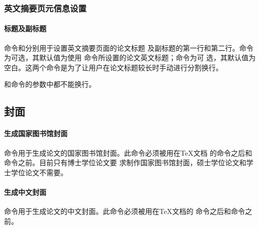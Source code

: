 \subsubsection{英文摘要页元信息设置}

\paragraph{标题及副标题}

命令和分别用于设置英文摘要页面的论文标题
及副标题的第一行和第二行。命令为可选，其默认值为使用
命令所设置的论文英文标题；命令为可
选，其默认值为空白。这两个命令是为了让用户在论文标题较长时手动进行分割换行。
\begin{tex}
\end{tex}
\begin{note}
和命令的参数中都不能换行。
\end{note}

\subsection{封面}

\paragraph{生成国家图书馆封面}

命令用于生成论文的国家图书馆封面。此命令必须被用在{\TeX}文档
的命令之后和命令之前。目前只有博士学位论文要
求制作国家图书馆封面，硕士学位论文和学士学位论文不需要。
\begin{tex}
\makenlctitle
\end{tex}

\paragraph{生成中文封面}

命令用于生成论文的中文封面。此命令必须被用在{\TeX}文档的
命令之后和命令之前。
\begin{tex}
\maketitle
\end{tex}


